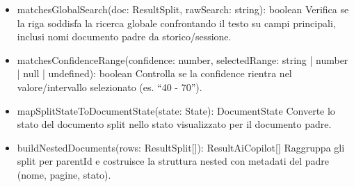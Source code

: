 \documentclass[a4paper,11pt]{article}
\begin{document}
\begin{itemize}[noitemsep, topsep=0pt]
\item matchesGlobalSearch(doc: ResultSplit, rawSearch: string): boolean
Verifica se la riga soddisfa la ricerca globale confrontando il testo su campi principali, inclusi nomi documento padre da storico/sessione.

\item matchesConfidenceRange(confidence: number, selectedRange: string | number | null | undefined): boolean
Controlla se la confidence rientra nel valore/intervallo selezionato (es. ``40 - 70'').

\item mapSplitStateToDocumentState(state: State): DocumentState
Converte lo stato del documento split nello stato visualizzato per il documento padre.

\item buildNestedDocuments(rows: ResultSplit[]): ResultAiCopilot[]
Raggruppa gli split per parentId e costruisce la struttura nested con metadati del padre (nome, pagine, stato).
\end{itemize}
\end{document}
